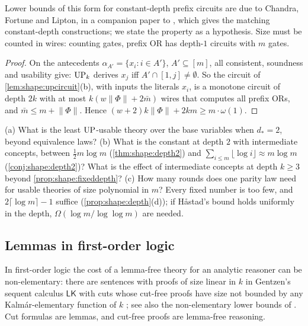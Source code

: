 Lower bounds of this form for constant-depth prefix circuits are due to Chandra, Fortune and Lipton, in a companion paper to \citet{chandra1985unbounded}, which gives the matching constant-depth constructions; we state the property as a hypothesis. Size must be counted in wires: counting gates, prefix OR has depth-$1$ circuits with $m$ gates.

\begin{proof}
On the antecedents $\alpha_{A'}=\{x_i:i\in A'\}$, $A'\subseteq[m]$, all consistent, soundness and usability give: $\mathrm{UP}_k$ derives $x_j$ iff $A'\cap[1,j]\ne\emptyset$. So the circuit of \cref{lem:shape:upcircuit}(b), with inputs the literals $x_i$, is a monotone circuit of depth $2k$ with at most $k(w\lVert\Phi\rVert+2\bar m)$ wires that computes all prefix ORs, and $\bar m\le m+\lVert\Phi\rVert$. Hence $(w+2)k\lVert\Phi\rVert+2km\ge m\cdot\omega(1)$.
\end{proof}

\begin{question}\label{q:shape:minimum}
(a) What is the least $\mathrm{UP}$-usable theory over the base variables when $d_*=2$, beyond equivalence laws? (b) What is the constant at depth $2$ with intermediate concepts, between $\frac12m\log m$ (\cref{thm:shape:depth2}) and $\sum_{i\le m}\lfloor\log i\rfloor\approx m\log m$ (\cref{conj:shape:depth2})? What is the effect of intermediate concepts at depth $k\ge3$ beyond \cref{prop:shape:fixeddepth}? (c) How many rounds does one parity law need for usable theories of size polynomial in $m$? Every fixed number is too few, and $2\lceil\log m\rceil-1$ suffice (\cref{prop:shape:depth}(d)); if H{\aa}stad's bound holds uniformly in the depth, $\Omega(\log m/\log\log m)$ are needed.
\end{question}

\subsection{Lemmas in first-order logic}\label{app:shape:fo}

In first-order logic the cost of a lemma-free theory for an analytic reasoner can be non-elementary: there are sentences with proofs of size linear in $k$ in Gentzen's sequent calculus $\mathsf{LK}$ with cuts whose cut-free proofs have size not bounded by any Kalm\'ar-elementary function of $k$ \citep{orevkov1982lower}; see also the non-elementary lower bounds of \citet{statman1979lower}. Cut formulas are lemmas, and cut-free proofs are lemma-free reasoning.

